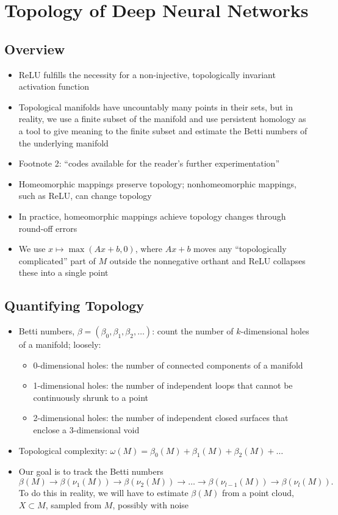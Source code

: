 \documentclass{article}
\begin{document}
\section*{Topology of Deep Neural Networks}

\subsection*{Overview}
\begin{itemize}
	\item ReLU fulfills the necessity for a non-injective, topologically invariant activation function
	\item Topological manifolds have uncountably many points in their sets, but in reality, we use a finite subset of the manifold and use persistent homology as a tool to give meaning to the finite subset and estimate the Betti numbers of the underlying manifold
	\item Footnote 2: ``codes available for the reader's further experimentation''
	\item Homeomorphic mappings preserve topology; nonhomeomorphic mappings, such as ReLU, can change topology
	\item In practice, homeomorphic mappings achieve topology changes through round-off errors
	\item We use $x \mapsto \max(Ax + b, 0)$, where $Ax+b$ moves any ``topologically complicated'' part of $M$ outside the nonnegative orthant and ReLU collapses these into a single point
\end{itemize}

\subsection*{Quantifying Topology}
\begin{itemize}
	\item Betti numbers, $\beta = (\beta_0, \beta_1, \beta_2, \dots)$: count the number of $k$-dimensional holes of a manifold; loosely:
	\begin{itemize}
		\item 0-dimensional holes: the number of connected components of a manifold
		\item 1-dimensional holes: the number of independent loops that cannot be continuously shrunk to a point
		\item 2-dimensional holes: the number of independent closed surfaces that enclose a 3-dimensional void
	\end{itemize}
	\item Topological complexity: $\omega(M) = \beta_0(M) + \beta_1(M) + \beta_2(M) + \dots$
	\item Our goal is to track the Betti numbers 
		$$\beta(M) \to \beta(\nu_1(M)) \to \beta(\nu_2(M)) \to \dots \to \beta(\nu_{l-1}(M)) \to \beta(\nu_{l}(M)).$$
		To do this in reality, we will have to estimate $\beta(M)$ from a point cloud, $X \subset M$, sampled from $M$, possibly with noise
\end{itemize}
\end{document}
